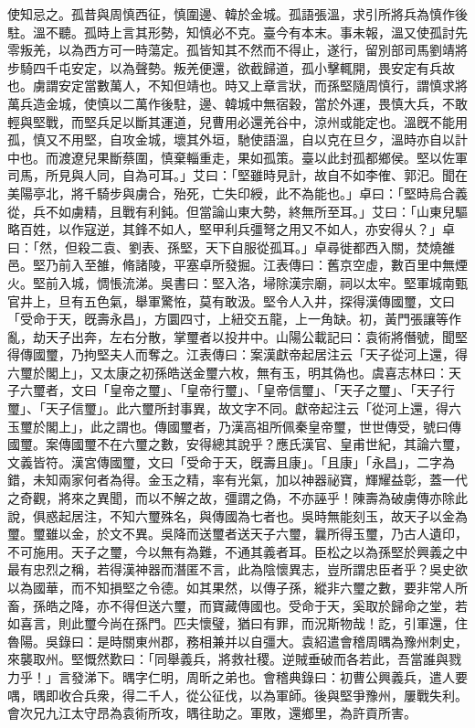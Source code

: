 \begin{pinyinscope}
使知忌之。孤昔與周慎西征，慎圍邊、韓於金城。孤語張溫，求引所將兵為慎作後駐。溫不聽。孤時上言其形勢，知慎必不克。臺今有本末。事未報，溫又使孤討先零叛羌，以為西方可一時蕩定。孤皆知其不然而不得止，遂行，留別部司馬劉靖將步騎四千屯安定，以為聲勢。叛羌便還，欲截歸道，孤小擊輒開，畏安定有兵故也。虜謂安定當數萬人，不知但靖也。時又上章言狀，而孫堅隨周慎行，謂慎求將萬兵造金城，使慎以二萬作後駐，邊、韓城中無宿穀，當於外運，畏慎大兵，不敢輕與堅戰，而堅兵足以斷其運道，兒曹用必還羌谷中，涼州或能定也。溫旣不能用孤，慎又不用堅，自攻金城，壞其外垣，馳使語溫，自以克在旦夕，溫時亦自以計中也。而渡遼兒果斷蔡圍，慎棄輜重走，果如孤策。臺以此封孤都鄉侯。堅以佐軍司馬，所見與人同，自為可耳。」艾曰：「堅雖時見計，故自不如李傕、郭汜。聞在美陽亭北，將千騎步與虜合，殆死，亡失印綬，此不為能也。」卓曰：「堅時烏合義從，兵不如虜精，且戰有利鈍。但當論山東大勢，終無所至耳。」艾曰：「山東兒驅略百姓，以作寇逆，其鋒不如人，堅甲利兵彊弩之用又不如人，亦安得乆？」卓曰：「然，但殺二袁、劉表、孫堅，天下自服從孤耳。」卓尋徙都西入關，焚燒雒邑。堅乃前入至雒，脩諸陵，平塞卓所發掘。江表傳曰：舊京空虛，數百里中無煙火。堅前入城，惆悵流涕。吳書曰：堅入洛，埽除漢宗廟，祠以太牢。堅軍城南甄官井上，旦有五色氣，舉軍驚恠，莫有敢汲。堅令人入井，探得漢傳國璽，文曰「受命于天，旣壽永昌」，方圜四寸，上紐交五龍，上一角缺。初，黃門張讓等作亂，劫天子出奔，左右分散，掌璽者以投井中。山陽公載記曰：袁術將僭號，聞堅得傳國璽，乃拘堅夫人而奪之。江表傳曰：案漢獻帝起居注云「天子從河上還，得六璽於閣上」，又太康之初孫皓送金璽六枚，無有玉，明其偽也。虞喜志林曰：天子六璽者，文曰「皇帝之璽」、「皇帝行璽」、「皇帝信璽」、「天子之璽」、「天子行璽」、「天子信璽」。此六璽所封事異，故文字不同。獻帝起注云「從河上還，得六玉璽於閣上」，此之謂也。傳國璽者，乃漢高祖所佩秦皇帝璽，世世傳受，號曰傳國璽。案傳國璽不在六璽之數，安得總其說乎？應氏漢官、皇甫世紀，其論六璽，文義皆符。漢宮傳國璽，文曰「受命于天，旣壽且康」。「且康」「永昌」，二字為錯，未知兩家何者為得。金玉之精，率有光氣，加以神器祕寶，輝耀益彰，蓋一代之奇觀，將來之異聞，而以不解之故，彊謂之偽，不亦誣乎！陳壽為破虜傳亦除此說，俱惑起居注，不知六璽殊名，與傳國為七者也。吳時無能刻玉，故天子以金為璽。璽雖以金，於文不異。吳降而送璽者送天子六璽，曩所得玉璽，乃古人遺印，不可施用。天子之璽，今以無有為難，不通其義者耳。臣松之以為孫堅於興義之中最有忠烈之稱，若得漢神器而潛匿不言，此為陰懷異志，豈所謂忠臣者乎？吳史欲以為國華，而不知損堅之令德。如其果然，以傳子孫，縱非六璽之數，要非常人所畜，孫皓之降，亦不得但送六璽，而寶藏傳國也。受命于天，奚取於歸命之堂，若如喜言，則此璽今尚在孫門。匹夫懷璧，猶曰有罪，而況斯物哉！訖，引軍還，住魯陽。吳錄曰：是時關東州郡，務相兼并以自彊大。袁紹遣會稽周㬂為豫州刺史，來襲取州。堅慨然歎曰：「同舉義兵，將救社稷。逆賊垂破而各若此，吾當誰與戮力乎！」言發涕下。㬂字仁明，周昕之弟也。會稽典錄曰：初曹公興義兵，遣人要喁，㬂即收合兵衆，得二千人，從公征伐，以為軍師。後與堅爭豫州，屢戰失利。會次兄九江太守昂為袁術所攻，㬂往助之。軍敗，還鄉里，為許貢所害。


\end{pinyinscope}
